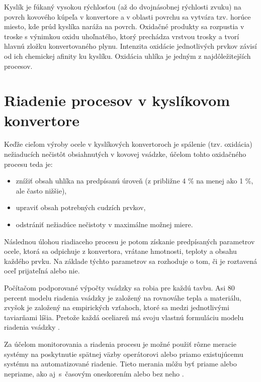 \documentclass[]{tukediphc}
\begin{document}
Kyslík je fúkaný vysokou rýchlosťou (až do dvojnásobnej rýchlosti zvuku) na povrch kovového kúpeľa v konvertore a v oblasti povrchu sa vytvára tzv. horúce miesto, kde prúd kyslíka naráža na povrch. Oxidačné produkty sa rozpustia v troske s výnimkou oxidu uhoľnatého, ktorý prechádza vrstvou trosky a tvorí hlavnú zložku konvertovaného plynu. Intenzita oxidácie jednotlivých prvkov závisí od ich chemickej afinity ku kyslíku. Oxidácia uhlíka je jedným z najdôležitejších procesov.

\section{Riadenie procesov v kyslíkovom konvertore}

Keďže cieľom výroby ocele v kyslíkových konvertoroch je spálenie (tzv. oxidácia) nežiaducích nečistôt obsiahnutých v kovovej vsádzke, účelom tohto oxidačného procesu teda je:

\begin{itemize}
	\item znížiť obsah uhlíka na predpísanú úroveň (z približne 4 \% na menej ako 1 \%, ale často nižšie),
	\item upraviť obsah potrebných cudzích prvkov,
	\item odstrániť nežiadúce nečistoty v maximálne možnej miere.
\end{itemize}

Následnou úlohou riadiaceho procesu je potom získanie predpísaných parametrov ocele, ktorá sa odpichuje z konvertora, vrátane hmotnosti, teploty a obsahu každého prvku. Na základe týchto parametrov sa rozhoduje o tom, či je roztavená oceľ prijateľná alebo nie.

Počítačom podporované výpočty vsádzky sa robia pre každú tavbu. Asi 80 percent modelu riadenia vsádzky je založený na rovnováhe tepla a materiálu, zvyšok je založený na empirických vzťahoch, ktoré sa medzi jednotlivými taviarňami líšia. Pretože každá oceliareň má svoju vlastnú formuláciu modelu riadenia vsádzky \cite{Turkdogan1996}.

Za účelom monitorovania a riadenia procesu je možné použiť rôzne meracie systémy na poskytnutie spätnej väzby operátorovi alebo priamo existujúcemu systému na automatizované riadenie. Tieto merania môžu byť priame alebo nepriame, ako aj~s~časovým oneskorením alebo bez neho \cite{Widlund1998}.
\end{document}
